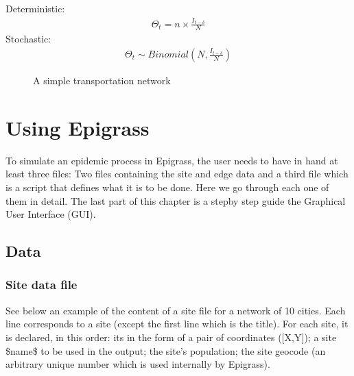 \documentclass[letterpaper,10pt,english]{sphinxmanual}
\begin{document}
Deterministic:
\begin{equation*}
\begin{split}\Theta_t=n\times\frac{I_{t-\delta}}{N}\end{split}
\end{equation*}
Stochastic:
\begin{equation*}
\begin{split}\Theta_t \sim Binomial(N,\frac{I_{t-\delta}}{N})\end{split}
\end{equation*}
\begin{figure}[htbp]
\centering
\capstart

\noindent{}
\caption{A simple transportation network}\label{\detokenize{intromodels:id3}}\label{\detokenize{intromodels:simpnet}}\end{figure}


\chapter{Using Epigrass}
\label{\detokenize{using:using-epigrass}}\label{\detokenize{using:using}}\label{\detokenize{using::doc}}
To simulate an epidemic process in Epigrass, the user needs to have in hand at least three files: Two files containing the site and edge data and a third file which is a script that defines what it is to be done. Here we go through each one of them in detail. The last part of this chapter is a step\sphinxhyphen{}by step guide the Graphical User Interface (GUI).


\section{Data}
\label{\detokenize{using:data}}

\subsection{Site data file}
\label{\detokenize{using:site-data-file}}
See below an example of the content of a site file for a network of 10 cities. Each line corresponds to a site (except the first line which is the title). For each site, it is declared, in this order: its  in the form of a pair of coordinates ({[}X,Y{]}); a site \$name\$ to be used in the output; the site’s population; the site geocode (an arbitrary unique number which is used internally by Epigrass).
\end{document}
